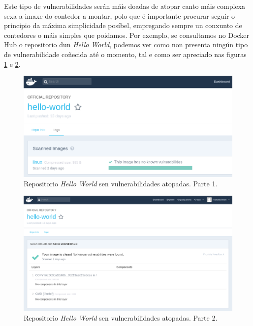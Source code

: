 Este tipo de vulnerabilidades serán máis doadas de atopar canto máis complexa sexa a imaxe do contedor a montar, polo que é importante procurar seguir o principio da máxima simplicidade posíbel, empregando sempre un conxunto de contedores o máis simples que poidamos. Por exemplo, se consultamos no Docker Hub o repositorio dun \textit{Hello World}, podemos ver como non presenta ningún tipo de vulnerabilidade coñecida até o momento, tal e como ser apreciado nas figuras \ref{helloWorldSenVulnerabilidades} e \ref{helloWorldSenVulnerabilidades2}.

\begin{figure}
\centerline{\includegraphics[width=15cm]{figuras/helloWorldSenVulnerabilidades.png}}
\caption{Repositorio \textit{Hello World} sen vulnerabilidades atopadas. Parte 1.}
\label{helloWorldSenVulnerabilidades}
\end{figure}

\begin{figure}
\centerline{\includegraphics[width=15cm]{figuras/helloWorldSenVulnerabilidades2.png}}
\caption{Repositorio \textit{Hello World} sen vulnerabilidades atopadas. Parte 2.}
\label{helloWorldSenVulnerabilidades2}
\end{figure}

